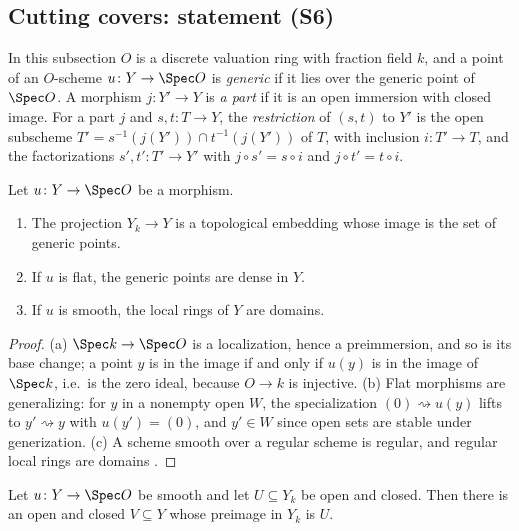 \subsection{Cutting covers: statement (S6)}\label{sec:pf:steps2:cut}

In this subsection $O$ is a discrete valuation ring with fraction field $k$, and a point of an
$O$-scheme $u\colon Y\to\Spec O$ is \emph{generic} if it lies over the generic point of $\Spec O$. A
morphism $j\colon Y'\to Y$ is \emph{a part} if it is an open immersion with closed image. For a part
$j$ and $s,t\colon T\to Y$, the \emph{restriction} of $(s,t)$ to $Y'$ is the open subscheme
$T'=s^{-1}(j(Y'))\cap t^{-1}(j(Y'))$ of $T$, with inclusion $i\colon T'\to T$, and the factorizations
$s',t'\colon T'\to Y'$ with $j\circ s'=s\circ i$ and $j\circ t'=t\circ i$.

\begin{lemma}\label{lem:pf:steps2:genfib}
Let $u\colon Y\to\Spec O$ be a morphism.
\begin{enumerate}[label=\textup{(\alph*)},nosep]
\item The projection $Y_k\to Y$ is a topological embedding whose image is the set of generic points.
\item If $u$ is flat, the generic points are dense in $Y$.
\item If $u$ is smooth, the local rings of $Y$ are domains.
\end{enumerate}
\end{lemma}

\begin{proof}
(a) $\Spec k\to\Spec O$ is a localization, hence a preimmersion, and so is its base change; a point
$y$ is in the image if and only if $u(y)$ is in the image of $\Spec k$, i.e.\ is the zero ideal,
because $O\to k$ is injective. (b) Flat morphisms are generalizing: for $y$ in a nonempty open $W$,
the specialization $(0)\rightsquigarrow u(y)$ lifts to $y'\rightsquigarrow y$ with $u(y')=(0)$, and
$y'\in W$ since open sets are stable under generization. (c) A scheme smooth over a regular scheme
is regular, and regular local rings are domains \cite{Grothendieck1967}.
\end{proof}

\begin{lemma}\label{lem:pf:steps2:clopen}
Let $u\colon Y\to\Spec O$ be smooth and let $U\subseteq Y_k$ be open and closed. Then there is an
open and closed $V\subseteq Y$ whose preimage in $Y_k$ is $U$.
\end{lemma}

